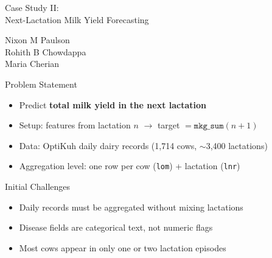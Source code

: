 \documentclass{beamer}
\begin{document}
{
\begin{frame}[noframenumbering]

\vspace{1.9cm}

\begin{center}
    {\fontsize{25}{29}\selectfont \color{tugreen}
    Case Study II:\\[0.25cm]
  Next-Lactation Milk Yield Forecasting}
\end{center}

\vspace{0.95cm}

\begin{flushleft}
{\large
Nixon M Paulson\\
Rohith B Chowdappa\\
Maria Cherian}
\end{flushleft}

\end{frame}
}

\begin{frame}{Problem Statement}

\begin{itemize}
    \item Predict \textbf{total milk yield in the next lactation}
    \item Setup: features from lactation $n$ $\rightarrow$ target $= \texttt{mkg\_sum}(n{+}1)$
    \item Data: OptiKuh daily dairy records (1,714 cows, $\sim$3,400 lactations)
    \item Aggregation level: one row per cow (\texttt{lom}) + lactation (\texttt{lnr})
\end{itemize}

\end{frame}

\begin{frame}{Initial Challenges}

\begin{itemize}
    \item Daily records must be aggregated without mixing lactations
    \item Disease fields are categorical text, not numeric flags
    \item Most cows appear in only one or two lactation episodes
\end{itemize}

\end{frame}
\end{document}

